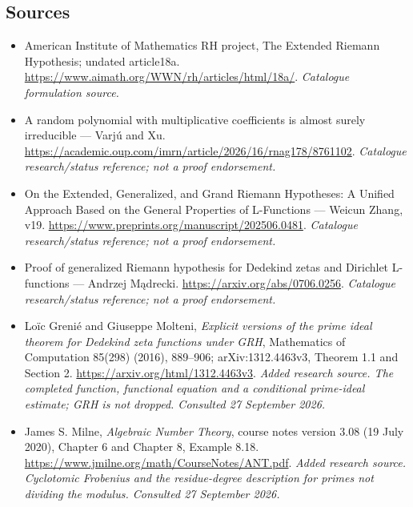 \documentclass[11pt,a4paper]{article}
\begin{document}
\subsection{Sources}
\begin{itemize}\raggedright
\item[\textnormal{[S1]}]\hypertarget{source:30006677:1}{} American Institute of Mathematics RH project, The Extended Riemann Hypothesis; undated article18a.
\url{https://www.aimath.org/WWN/rh/articles/html/18a/}.
{\small\textit{Catalogue formulation source.}}
\item[\textnormal{[S2]}]\hypertarget{source:30006677:2}{} A random polynomial with multiplicative coefficients is almost surely irreducible — Varjú and Xu.
\url{https://academic.oup.com/imrn/article/2026/16/rnag178/8761102}.
{\small\textit{Catalogue research/status reference; not a proof endorsement.}}
\item[\textnormal{[S3]}]\hypertarget{source:30006677:3}{} On the Extended, Generalized, and Grand Riemann Hypotheses: A Unified Approach Based on the General Properties of L-Functions — Weicun Zhang, v19.
\url{https://www.preprints.org/manuscript/202506.0481}.
{\small\textit{Catalogue research/status reference; not a proof endorsement.}}
\item[\textnormal{[S4]}]\hypertarget{source:30006677:4}{} Proof of generalized Riemann hypothesis for Dedekind zetas and Dirichlet L-functions — Andrzej Mądrecki.
\url{https://arxiv.org/abs/0706.0256}.
{\small\textit{Catalogue research/status reference; not a proof endorsement.}}
\item[\textnormal{[E1]}]\hypertarget{extra:30006677:1}{} Loïc Grenié and Giuseppe Molteni, \emph{Explicit versions of the prime ideal theorem for Dedekind zeta functions under GRH}, Mathematics of Computation 85(298) (2016), 889--906; arXiv:1312.4463v3, Theorem 1.1 and Section 2.
\url{https://arxiv.org/html/1312.4463v3}.
{\small\textit{Added research source. The completed function, functional equation and a conditional prime-ideal estimate; GRH is not dropped. Consulted 27 September 2026.}}
\item[\textnormal{[E2]}]\hypertarget{extra:30006677:2}{} James S. Milne, \emph{Algebraic Number Theory}, course notes version 3.08 (19 July 2020), Chapter 6 and Chapter 8, Example 8.18.
\url{https://www.jmilne.org/math/CourseNotes/ANT.pdf}.
{\small\textit{Added research source. Cyclotomic Frobenius and the residue-degree description for primes not dividing the modulus. Consulted 27 September 2026.}}
\end{itemize}

\end{document}
